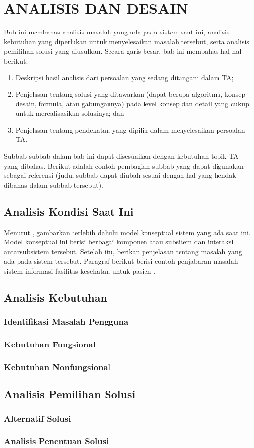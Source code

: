 
\cleardoublepage
\chapter{ANALISIS DAN DESAIN}
\label{chap:analisis-desain}
Bab ini membahas analisis masalah yang ada pada sistem saat ini, analisis kebutuhan yang diperlukan
untuk menyelesaikan masalah tersebut, serta analisis pemilihan solusi yang diusulkan. Secara garis besar,
bab ini membahas hal-hal berikut:
\begin{enumerate}[1.]
    \item Deskripsi hasil analisis dari persoalan yang sedang ditangani dalam TA;
    \item Penjelasan tentang solusi yang ditawarkan (dapat berupa algoritma, konsep desain, formula, atau gabungannya) 
    pada level konsep dan detail yang cukup untuk merealisasikan solusinya; dan
    \item Penjelasan tentang pendekatan yang dipilih dalam menyelesaikan persoalan TA.
\end{enumerate}
Subbab-subbab dalam bab ini dapat disesuaikan dengan kebutuhan topik TA yang dibahas. Berikut adalah contoh pembagian subbab
yang dapat digunakan sebagai referensi (judul subbab dapat diubah sesuai dengan hal yang hendak dibahas dalam subbab tersebut).

\section{Analisis Kondisi Saat Ini}
Menurut \textcite{laudon2020}, gambarkan terlebih dahulu model konseptual sistem yang ada saat ini. Model konseptual ini berisi berbagai komponen atau subsitem dan interaksi antarsubsistem tersebut. Setelah itu, berikan penjelasan tentang masalah yang ada pada sistem tersebut. Paragraf berikut berisi contoh penjabaran masalah sistem informasi fasilitas kesehatan untuk pasien \autocite{pressman2019}. 
\section{Analisis Kebutuhan}
\lipsum[4]
\subsection{Identifikasi Masalah Pengguna}
\lipsum[5]
\subsection{Kebutuhan Fungsional}
\lipsum[6]
\subsection{Kebutuhan Nonfungsional}
\lipsum[7]

\section{Analisis Pemilihan Solusi}
\subsection{Alternatif Solusi}
\lipsum[8]
\subsection{Analisis Penentuan Solusi}
\lipsum[9]